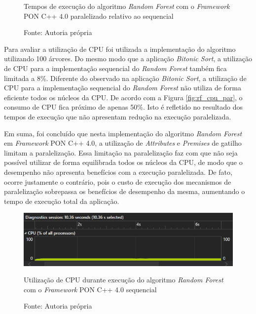 \begin{figure}[!htb]
\centering
{}
\caption{Tempos de execução do algoritmo \textit{Random
Forest} com o \textit{Framework} PON C++ 4.0 paralelizado relativo ao sequencial}
\caption*{Fonte: Autoria própria}
\label{fig:random_forest_rel}
\end{figure}

Para avaliar a utilização de CPU foi utilizada a implementação do algoritmo
utilizando 100 árvores. Do mesmo modo que a aplicação \textit{Bitonic Sort}, a
utilização de CPU para a implementação sequencial do \textit{Random Forest}
também fica limitada a 8\%. Diferente do observado na aplicação \textit{Bitonic
Sort}, a utilização de CPU para a implementação sequencial do \textit{Random
Forest} não utiliza de forma eficiente todos os núcleos da CPU. De acordo com a
Figura \ref{fig:rf_cpu_par}, o consumo de CPU fica próximo de apenas 50\%. Isto
é refletido no resultado dos tempos de execução que não apresentam redução na
execução paralelizada.

Em suma, foi concluído que nesta implementação do algoritmo \textit{Random
Forest} em \textit{Framework} PON C++ 4.0, a utilização de \textit{Attributes} e
\textit{Premises} de gatilho limitam a paralelização. Essa limitação na
paralelização faz com que não seja possível utilizar de forma equilibrada todos
os núcleos da CPU, de modo que o desempenho não apresenta benefícios com a
execução paralelizada. De fato, ocorre justamente o contrário, pois o custo de
execução dos mecanismos de paralelização sobrepassa os benefícios de desempenho
da  mesma, aumentando o tempo de execução total da aplicação.

\begin{figure}[!htb]
\centering
\includegraphics[width=\textwidth]{../figures/cpu_rf.png}
\smallskip
\caption{Utilização de CPU durante execução do algoritmo \textit{Random Forest}
com o \textit{Framework} PON C++ 4.0 sequencial}
\caption*{Fonte: Autoria própria}
\label{fig:rf_cpu}
\end{figure}

